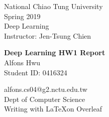 


\begin{titlepage} %

	
\begin{minipage}{0.4\textwidth} %
    \begin{flushleft} %
    \large
    National Chiao Tung University\\ %
    Spring 2019 \\ %
    Deep Learning \\ %
    Instructor: Jen-Tsung Chien\\ %
    \end{flushleft}
\end{minipage}
	
\vspace*{2in} %
	
\center %

	
{\huge\bfseries Deep Learning HW1 Report}\\[0.4cm] %
Alfons Hwu \\ %
Student ID: 0416324\\
\vfill %


\vfill %

alfons.cs04@g2.nctu.edu.tw \\ %
Dept of Computer Science \\ %
Writing with \LaTeX  on Overleaf

\vfill %


\vfill %
	
\end{titlepage}